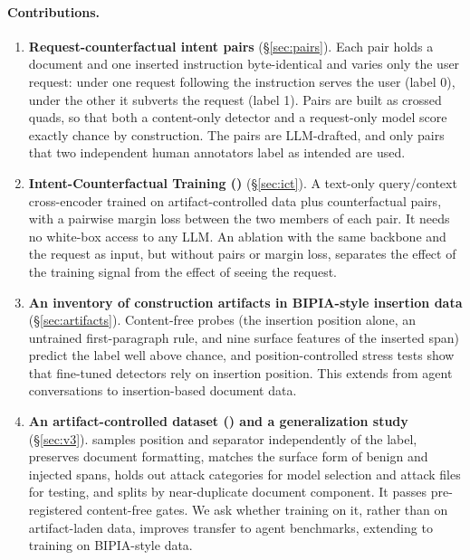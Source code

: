 \paragraph{Contributions.}
\begin{enumerate}
  \item \textbf{Request-counterfactual intent pairs} (\S\ref{sec:pairs}). Each pair holds a document and one inserted
  instruction byte-identical and varies only the user request: under one request following the instruction serves
  the user (label 0), under the other it subverts the request (label 1). Pairs are built as crossed quads, so that
  both a content-only detector and a request-only model score exactly chance by construction. The pairs are
  LLM-drafted, and only pairs that two independent human annotators label as intended are used.
  \item \textbf{Intent-Counterfactual Training (\ict{})} (\S\ref{sec:ict}). A text-only query/context cross-encoder
  trained on artifact-controlled data plus counterfactual pairs, with a pairwise margin loss between the two members
  of each pair. It needs no white-box access to any LLM. An ablation with the same backbone and the request as input,
  but without pairs or margin loss, separates the effect of the training signal from the effect of seeing the request.
  \item \textbf{An inventory of construction artifacts in BIPIA-style insertion data} (\S\ref{sec:artifacts}).
  Content-free probes (the insertion position alone, an untrained first-paragraph rule, and nine surface features of
  the inserted span) predict the label well above chance, and position-controlled stress tests show that fine-tuned
  detectors rely on insertion position. This extends \citet{kale2026probes} from agent conversations to
  insertion-based document data.
  \item \textbf{An artifact-controlled dataset (\vthree) and a generalization study} (\S\ref{sec:v3}). \vthree{}
  samples position and separator independently of the label, preserves document formatting, matches the surface form
  of benign and injected spans, holds out attack categories for model selection and attack files for testing, and
  splits by near-duplicate document component. It passes pre-registered content-free gates. We ask whether training
  on it, rather than on artifact-laden data, improves transfer to agent benchmarks, extending \citet{liu2026passing}
  to training on BIPIA-style data.
\end{enumerate}

